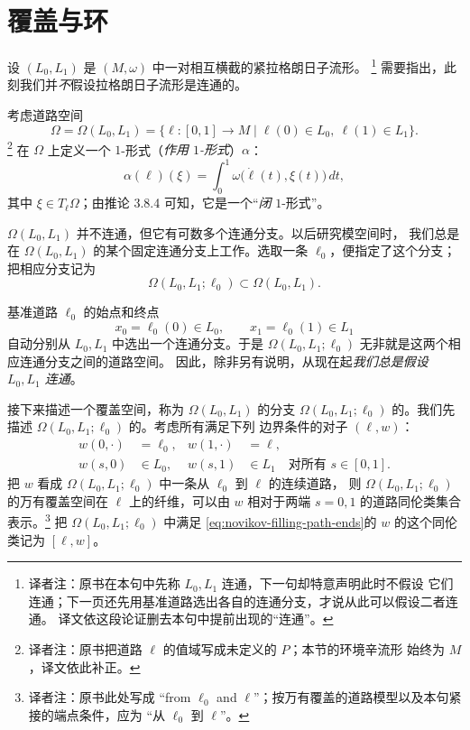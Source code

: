 \section{\personNovikov{}覆盖与\personNovikov{}环}
\label{sec:novikov-covering-ring}

设 $(L_0,L_1)$ 是 $(M,\omega)$ 中一对相互横截的紧拉格朗日子流形。
\footnote{译者注：原书在本句中先称 $L_0,L_1$ 连通，下一句却特意声明此时不假设
它们连通；下一页还先用基准道路选出各自的连通分支，才说从此可以假设二者连通。
译文依这段论证删去本句中提前出现的“连通”。}
需要指出，此刻我们并\emph{不}假设拉格朗日子流形是连通的。

考虑道路空间
\[
  \Omega=\Omega(L_0,L_1)
  =\{\ell:[0,1]\longrightarrow M
    \mid \ell(0)\in L_0,\ \ell(1)\in L_1\}.
\]
\footnote{译者注：原书把道路 $\ell$ 的值域写成未定义的 $P$；本节的环境辛流形
始终为 $M$，译文依此补正。}
在 $\Omega$ 上定义一个 $1$-形式（\emph{作用 $1$-形式}）$\alpha$：
\begin{equation}
  \alpha(\ell)(\xi)
  =\int_0^1\omega\bigl(\dot\ell(t),\xi(t)\bigr)\,dt,
\label{eq:lagrangian-action-one-form}
\end{equation}
其中 $\xi\in T_\ell\Omega$；由推论 3.8.4 可知，它是一个“\emph{闭} $1$-形式”。

$\Omega(L_0,L_1)$ 并不连通，但它有可数多个连通分支。以后研究\personFloer{}模空间时，
我们总是在 $\Omega(L_0,L_1)$ 的某个固定连通分支上工作。选取一条\emph{\termBasePath{}} $\ell_0$，便指定了这个分支；把相应分支记为
\[
  \Omega(L_0,L_1;\ell_0)\subset\Omega(L_0,L_1).
\]

基准道路 $\ell_0$ 的始点和终点
\[
  x_0=\ell_0(0)\in L_0,
  \qquad
  x_1=\ell_0(1)\in L_1
\]
自动分别从 $L_0,L_1$ 中选出一个连通分支。于是
$\Omega(L_0,L_1;\ell_0)$ 无非就是这两个相应连通分支之间的道路空间。
因此，除非另有说明，从现在起\emph{我们总是假设 $L_0,L_1$ 连通}。

接下来描述一个覆盖空间，称为 $\Omega(L_0,L_1)$ 的分支
$\Omega(L_0,L_1;\ell_0)$ 的\emph{\termNovikovCovering{}}。我们先描述
$\Omega(L_0,L_1;\ell_0)$ 的\termUniversalCoveringSpace{}。考虑所有满足下列
边界条件的对子 $(\ell,w)$：
\begin{align}
  w(0,\mathord\cdot)&=\ell_0,
  &w(1,\mathord\cdot)&=\ell,
  \label{eq:novikov-filling-path-ends}\\
  w(s,0)&\in L_0,
  &w(s,1)&\in L_1
  \quad\text{对所有 }s\in[0,1].
  \label{eq:novikov-filling-boundary}
\end{align}
把 $w$ 看成 $\Omega(L_0,L_1;\ell_0)$ 中一条从 $\ell_0$ 到 $\ell$ 的连续道路，
则 $\Omega(L_0,L_1;\ell_0)$ 的万有覆盖空间在 $\ell$ 上的纤维，可以由 $w$
相对于两端 $s=0,1$ 的道路同伦类集合表示。\footnote{译者注：原书此处写成
“from $\ell_0$ and $\ell$”；按万有覆盖的道路模型以及本句紧接的端点条件，应为
“从 $\ell_0$ 到 $\ell$”。}
把 $\Omega(L_0,L_1;\ell_0)$ 中满足
\eqref{eq:novikov-filling-path-ends}的 $w$ 的这个同伦类记为 $[\ell,w]$。

